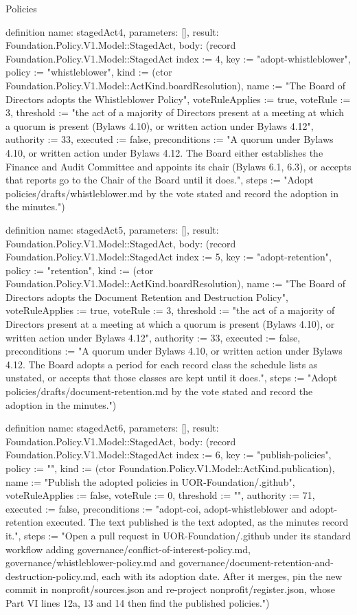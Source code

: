 \begin{lexlean}{Policies}
\begin{semanticmodule}
definition{
  name: stagedAct4,
  parameters: [],
  result: Foundation.Policy.V1.Model::StagedAct,
  body: (record Foundation.Policy.V1.Model::StagedAct {index := 4, key := "adopt-whistleblower", policy := "whistleblower", kind := (ctor Foundation.Policy.V1.Model::ActKind.boardResolution), name := "The Board of Directors adopts the Whistleblower Policy", voteRuleApplies := true, voteRule := 3, threshold := "the act of a majority of Directors present at a meeting at which a quorum is present (Bylaws 4.10), or written action under Bylaws 4.12", authority := 33, executed := false, preconditions := "A quorum under Bylaws 4.10, or written action under Bylaws 4.12. The Board either establishes the Finance and Audit Committee and appoints its chair (Bylaws 6.1, 6.3), or accepts that reports go to the Chair of the Board until it does.", steps := "Adopt policies/drafts/whistleblower.md by the vote stated and record the adoption in the minutes."})
}

definition{
  name: stagedAct5,
  parameters: [],
  result: Foundation.Policy.V1.Model::StagedAct,
  body: (record Foundation.Policy.V1.Model::StagedAct {index := 5, key := "adopt-retention", policy := "retention", kind := (ctor Foundation.Policy.V1.Model::ActKind.boardResolution), name := "The Board of Directors adopts the Document Retention and Destruction Policy", voteRuleApplies := true, voteRule := 3, threshold := "the act of a majority of Directors present at a meeting at which a quorum is present (Bylaws 4.10), or written action under Bylaws 4.12", authority := 33, executed := false, preconditions := "A quorum under Bylaws 4.10, or written action under Bylaws 4.12. The Board adopts a period for each record class the schedule lists as unstated, or accepts that those classes are kept until it does.", steps := "Adopt policies/drafts/document-retention.md by the vote stated and record the adoption in the minutes."})
}

definition{
  name: stagedAct6,
  parameters: [],
  result: Foundation.Policy.V1.Model::StagedAct,
  body: (record Foundation.Policy.V1.Model::StagedAct {index := 6, key := "publish-policies", policy := "", kind := (ctor Foundation.Policy.V1.Model::ActKind.publication), name := "Publish the adopted policies in UOR-Foundation/.github", voteRuleApplies := false, voteRule := 0, threshold := "", authority := 71, executed := false, preconditions := "adopt-coi, adopt-whistleblower and adopt-retention executed. The text published is the text adopted, as the minutes record it.", steps := "Open a pull request in UOR-Foundation/.github under its standard workflow adding governance/conflict-of-interest-policy.md, governance/whistleblower-policy.md and governance/document-retention-and-destruction-policy.md, each with its adoption date. After it merges, pin the new commit in nonprofit/sources.json and re-project nonprofit/register.json, whose Part VI lines 12a, 13 and 14 then find the published policies."})
}


\end{semanticmodule}
\end{lexlean}
